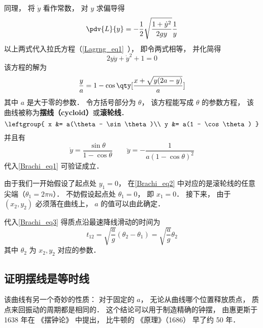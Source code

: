 同理， 将 $\dot y$ 看作常数， 对 $y$ 求偏导得
\begin{equation}
\pdv{L}{y} = -\frac{1}{2} \sqrt{\frac{1 + \dot{y}^2}{2gy}} \frac{1}{y}
\end{equation}
以上两式代入拉氏方程（\autoref{Lagrng_eq1}~）， 即令两式相等， 并化简得
\begin{equation}\label{Brachi_eq1}
2y\ddot y + \dot y^2 + 1 = 0
\end{equation}
该方程的解为
\begin{equation}
\frac{y}{a} = 1 - \cos\qty[\frac{x + \sqrt{y(2a-y)}}{a}]
\end{equation}
其中 $a$ 是大于零的参数． 令方括号部分为 $\theta$， 该方程能写成 $\theta$ 的参数方程， 该曲线被称为\textbf{摆线（cycloid）}或\textbf{滚轮线}． %
\begin{equation}\label{Brachi_eq2}
\leftgroup{
x &= a(\theta - \sin\theta)\\
y &= a(1 - \cos\theta)
}\end{equation}
并且有
\begin{equation}
\dot y = \frac{\sin\theta}{1 - \cos\theta} \qquad
\ddot y = -\frac{1}{a(1-\cos\theta)^2}
\end{equation}
代入\autoref{Brachi_eq1} 可验证成立．

由于我们一开始假设了起点处 $y_1 = 0$， 在\autoref{Brachi_eq2} 中对应的是滚轮线的任意尖端（$\theta_1 = 2\pi n$）． 不妨假设起点处 $\theta_1 = 0$， 即 $x_1 = 0$． 接下来， 由于 $(x_2, y_2)$ 必须落在曲线上，  $a$ 的值可以由此确定．

代入\autoref{Brachi_eq3} 得质点沿最速降线滑动的时间为
\begin{equation}\label{Brachi_eq4}
t_{12} = \sqrt{\frac{a}{g}}(\theta_2 - \theta_1) = \sqrt{\frac{a}{g}} \theta_2
\end{equation}
其中 $\theta_2$ 为 $x_2, y_2$ 对应的参数．


\subsection{证明摆线是等时线}
该曲线有另一个奇妙的性质： 对于固定的 $a$， 无论从曲线哪个位置释放质点， 质点来回振动的周期都是相同的． 这个结论可以用于制造精确的钟摆， 由惠更斯于 1638 年在 《摆钟论》 中提出， 比牛顿的 《原理》（1686） 早了约 50 年．


